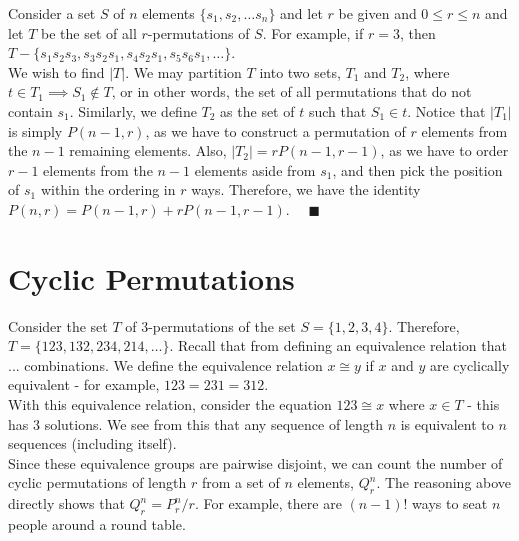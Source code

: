 \documentclass[11pt,twosided]{article}
\begin{document}
Consider a set $S$ of $n$ elements $\{s_1, s_2, \ldots s_n\}$ and let $r$ be given and $0 \leq r \leq n$ and let $T$ be the set of all $r$-permutations of $S$. For example, if $r = 3$, then $T - \{s_1s_2s_3, s_3s_2s_1, s_4s_2s_1, s_5s_6s_1, \ldots \}$.\\
We wish to find $|T|$. We may partition $T$ into two sets, $T_1$ and $T_2$, where $t \in T_1 \implies S_1 \not\in T$, or in other words, the set of all permutations that do not contain $s_1$. Similarly, we define $T_2$ as the set of $t$ such that $S_1 \in t$. Notice that $|T_1|$ is simply $P(n-1, r)$, as we have to construct a permutation of $r$ elements from the $n-1$ remaining elements. Also, $|T_2| = r P(n-1, r-1)$, as we have to order $r-1$ elements from the $n-1$ elements aside from $s_1$, and then pick the position of $s_1$ within the ordering in $r$ ways. Therefore, we have the identity $P(n, r) = P(n-1, r) + r P(n-1, r-1).$ $\quad \blacksquare$

\section{Cyclic Permutations}
Consider the set $T$ of $3$-permutations of the set $S = \{1, 2, 3, 4\}$. Therefore, $T = \{123, 132, 234, 214, \ldots \}$. Recall that from defining an equivalence relation that ... combinations. 
We define the equivalence relation $x \cong y$ if $x$ and $y$ are cyclically equivalent - for example, $123 = 231 = 312$. \\
With this equivalence relation, consider the equation $123 \cong x$ where $x \in T$ - this has $3$ solutions. We see from this that any sequence of length $n$ is equivalent to $n$ sequences (including itself).\\
Since these equivalence groups are pairwise disjoint, we can count the number of cyclic permutations of length $r$ from a set of $n$ elements, $Q_r^n$. The reasoning above directly shows that $Q_r^n = P_r^n / r$. For example, there are $(n-1)!$ ways to seat $n$ people around a round table. \\
\end{document}
